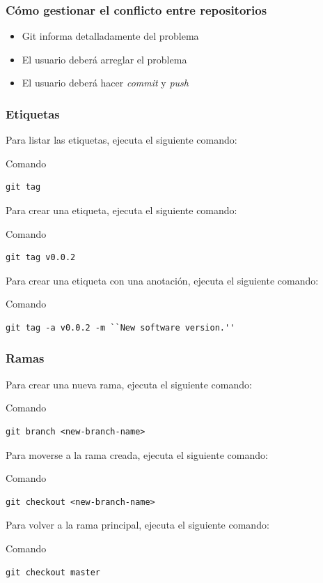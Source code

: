 \documentclass{beamer}
\begin{document}
\begin{frame}[fragile]
\frametitle{Cómo gestionar el conflicto entre repositorios}
\begin{itemize}
\item Git informa detalladamente del problema
\item El usuario deberá arreglar el problema
\item El usuario deberá hacer \textit{commit} y \textit{push}
\end{itemize}
\end{frame}

\begin{frame}[fragile]
\frametitle{Etiquetas}
Para listar las etiquetas, ejecuta el siguiente comando:
\begin{block}{Comando}
\begin{verbatim}
git tag
\end{verbatim}
\end{block}
\vskip 0.20cm
Para crear una etiqueta, ejecuta el siguiente comando:
\begin{block}{Comando}
\begin{verbatim}
git tag v0.0.2
\end{verbatim}
\end{block}
\vskip 0.20cm
Para crear una etiqueta con una anotación, ejecuta el siguiente comando:
\begin{block}{Comando}
\begin{verbatim}
git tag -a v0.0.2 -m ``New software version.''
\end{verbatim}
\end{block}
\end{frame}

\begin{frame}[fragile]
\frametitle{Ramas}
Para crear una nueva rama, ejecuta el siguiente comando:
\begin{block}{Comando}
\begin{verbatim}
git branch <new-branch-name>
\end{verbatim}
\end{block}
\vskip 0.25cm
Para moverse a la rama creada, ejecuta el siguiente comando:
\begin{block}{Comando}
\begin{verbatim}
git checkout <new-branch-name>
\end{verbatim}
\end{block}
\vskip 0.25cm
Para volver a la rama principal, ejecuta el siguiente comando:
\begin{block}{Comando}
\begin{verbatim}
git checkout master
\end{verbatim}
\end{block}
\end{frame}
\end{document}
